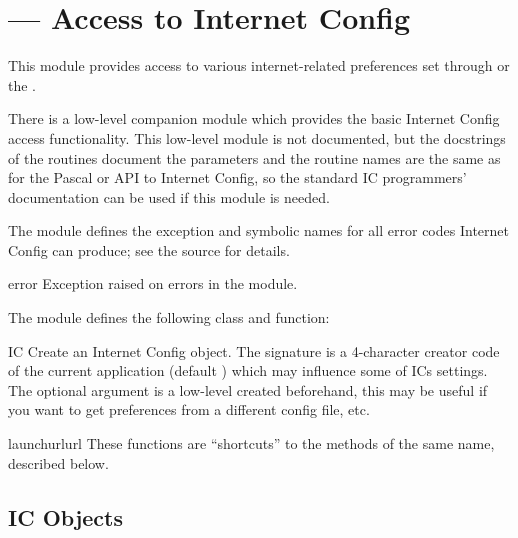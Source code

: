 \section{ ---
         Access to Internet Config}



This module provides access to various internet-related preferences
set through  or the .

There is a low-level companion module
 which provides the basic
Internet Config access functionality.  This low-level module is not
documented, but the docstrings of the routines document the parameters
and the routine names are the same as for the Pascal or \C{} API to
Internet Config, so the standard IC programmers' documentation can be
used if this module is needed.

The  module defines the  exception and
symbolic names for all error codes Internet Config can produce; see
the source for details.

\begin{excdesc}{error}
Exception raised on errors in the  module.
\end{excdesc}


The  module defines the following class and function:

\begin{classdesc}{IC}{}
Create an Internet Config object. The signature is a 4-character creator
code of the current application (default ) which may
influence some of ICs settings. The optional  argument is a
low-level  created beforehand, this may be
useful if you want to get preferences from a different config file,
etc.
\end{classdesc}

\begin{funcdesc}{launchurl}{url}
These functions are ``shortcuts'' to the methods of the same name,
described below.
\end{funcdesc}


\subsection{IC Objects}

